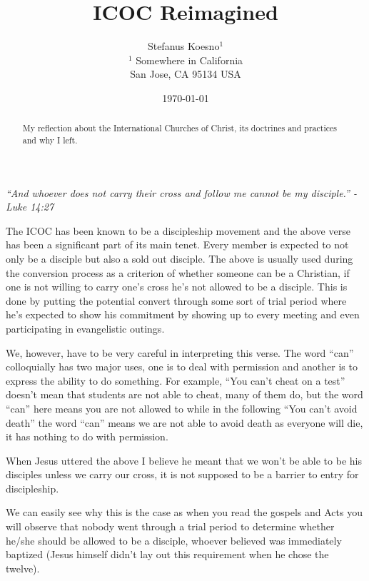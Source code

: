 \documentclass[aps,preprint,preprintnumbers,nofootinbib,showpacs,prd]{revtex4-1}
\begin{document}
\title{ICOC Reimagined}
\bigskip
\author{Stefanus Koesno$^1$\\
$^1$ Somewhere in California\\ San Jose, CA 95134 USA\\
}
%
\date{\today}
%
\begin{abstract}
My reflection about the International Churches of Christ, its doctrines and practices and why I left.

\end{abstract}
%
\maketitle

\renewcommand{\theequation}{A.\arabic{equation}}  %
\setcounter{equation}{0}  %



{\it ``And whoever does not carry their cross and follow me cannot be my disciple.'' - Luke 14:27}

The ICOC has been known to be a discipleship movement and the above verse has been a significant part of its main tenet. Every member is expected to not only be a disciple but also a sold out disciple. The above is usually used during the conversion process as a criterion of whether someone can be a Christian, if one is not willing to carry one's cross he's not allowed to be a disciple. This is done by putting the potential convert through some sort of trial period where he's expected to show his commitment by showing up to every meeting and even participating in evangelistic outings. 

We, however, have to be very careful in interpreting this verse. The word ``can'' colloquially has two major uses, one is to deal with permission and another is to express the ability to do something. For example, ``You can't cheat on a test'' doesn't mean that students are not able to cheat, many of them do, but the word ``can'' here means you are not allowed to while in the following ``You can't avoid death'' the word ``can'' means we are not able to avoid death as everyone will die, it has nothing to do with permission.

When Jesus uttered the above I believe he meant that we won't be able to be his disciples unless we carry our cross, it is not supposed to be a barrier to entry for discipleship. 

We can easily see why this is the case as when you read the gospels and Acts you will observe that nobody went through a trial period to determine whether he/she should be allowed to be a disciple, whoever believed was immediately baptized (Jesus himself didn't lay out this requirement when he chose the twelve).
\end{document}
